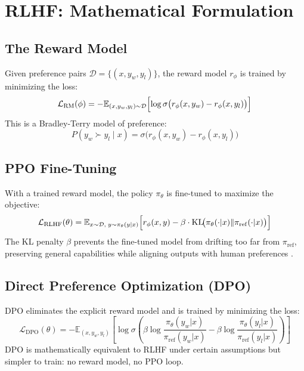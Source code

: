 \section{RLHF: Mathematical Formulation}
\label{sec:a17-rlhf}

\subsection{The Reward Model}

Given preference pairs $\mathcal{D} = \{(x, y_w, y_l)\}$, the reward model $r_\phi$ is trained by minimizing the loss:
\[
\mathcal{L}_{\mathrm{RM}}(\phi) = -\mathbb{E}_{(x, y_w, y_l) \sim \mathcal{D}} \Bigl[\log \sigma\bigl(r_\phi(x, y_w) - r_\phi(x, y_l)\bigr)\Bigr]
\]
This is a Bradley-Terry model of preference:
\[
P(y_w \succ y_l \mid x) = \sigma\bigl(r_\phi(x, y_w) - r_\phi(x, y_l)\bigr)
\]

\subsection{PPO Fine-Tuning}

With a trained reward model, the policy $\pi_\theta$ is fine-tuned to maximize the objective:
\[
\mathcal{L}_{\mathrm{RLHF}}(\theta)
  = \mathbb{E}_{x \sim \mathcal{D},\; y \sim \pi_\theta(y|x)}
    \Bigl[r_\phi(x, y) - \beta \cdot \mathrm{KL}\!\bigl(\pi_\theta(\cdot|x) \| \pi_{\mathrm{ref}}(\cdot|x)\bigr)\Bigr]
\]
The KL penalty $\beta$ prevents the fine-tuned model from drifting too far from $\pi_{\mathrm{ref}}$, preserving general capabilities while aligning outputs with human preferences \autocite{christiano2017deep,ouyang2022training}.

\subsection{Direct Preference Optimization (DPO)}

DPO \autocite{rafailov2023direct} eliminates the explicit reward model and is trained by minimizing the loss:
\[
\mathcal{L}_{\mathrm{DPO}}(\theta)
  = -\mathbb{E}_{(x, y_w, y_l)} \left[\log \sigma\!\left(
      \beta \log \frac{\pi_\theta(y_w|x)}{\pi_{\mathrm{ref}}(y_w|x)}
    - \beta \log \frac{\pi_\theta(y_l|x)}{\pi_{\mathrm{ref}}(y_l|x)}
  \right)\right]
\]
DPO is mathematically equivalent to RLHF under certain assumptions but simpler to train: no reward model, no PPO loop.

